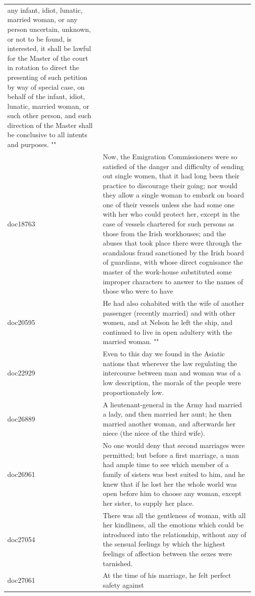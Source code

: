 \documentclass[
]{article}
\begin{document}
\begin{longtable}[t]{ll}
any infant, idiot, lunatic, married woman, or any person
uncertain, unknown, or not to be found, is interested, it
shall be lawful for the Master of the court in rotation to
direct the presenting of such petition by way of special
case, on behalf of the infant, idiot, lunatic, married
woman, or such other person, and such direction of the
Master shall be conclusive to all intents and purposes. ""\\
doc18763 & Now, the Emigration Commissioners were so satisfied of the
danger and difficulty of sending out single women, that it
had long been their practice to discourage their going; nor
would they allow a single woman to embark on board one of
their vessels unless she had some one with her who could
protect her, except in the case of vessels chartered for
such persons as those from the Irish workhouses; and the
abuses that took place there were through the scandalous
fraud sanctioned by the Irish board of guardians, with whose
direct cognisance the master of the work-house substituted
some improper characters to answer to the names of those who
were to have\\
doc20595 & He had also cohabited with the wife of another passenger
(recently married) and with other women, and at Nelson he
left the ship, and continued to live in open adultery with
the married woman. ""\\
\addlinespace
doc22929 & Even to this day we found in the Asiatic nations that
wherever the law regulating the intercourse between man and
woman was of a low description, the morals of the people
were proportionately low.\\
doc26889 & A lieutenant-general in the Army had married a lady, and
then married her aunt; he then married another woman, and
afterwards her niece (the niece of the third wife).\\
doc26961 & No one would deny that second marriages were permitted; but
before a first marriage, a man had ample time to see which
member of a family of sisters was best suited to him, and he
knew that if he lost her the whole world was open before him
to choose any woman, except her sister, to supply her place.\\
doc27054 & There was all the gentleness of woman, with all her
kindliness, all the emotions which could be introduced into
the relationship, without any of the sensual feelings by
which the highest feelings of affection between the sexes
were tarnished.\\
doc27061 & At the time of his marriage, he felt perfect safety against

\end{longtable}
\end{document}
